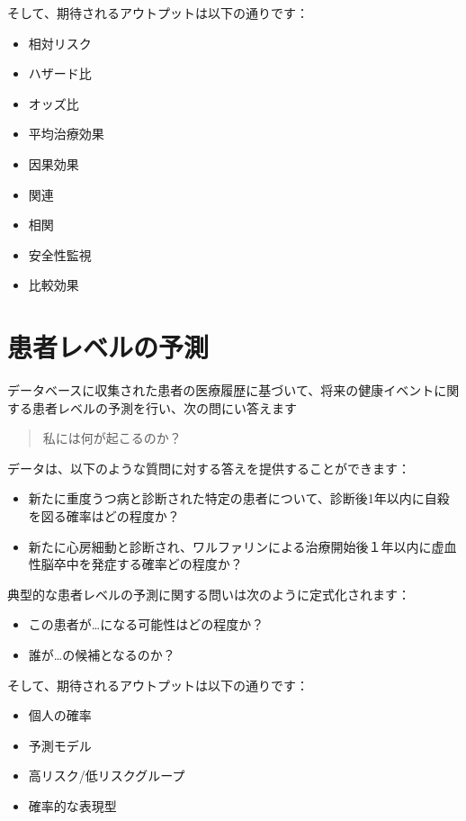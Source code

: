 \documentclass[
  11pt]{book}
\providecommand{\tightlist}{%
  \setlength{\itemsep}{0pt}\setlength{\parskip}{0pt}}
\theoremstyle{definition}
\theoremstyle{definition}
\theoremstyle{definition}
\theoremstyle{definition}
\theoremstyle{remark}
\begin{document}
そして、期待されるアウトプットは以下の通りです：

\begin{itemize}
\tightlist
\item
  相対リスク
\item
  ハザード比
\item
  オッズ比
\item
  平均治療効果
\item
  因果効果
\item
  関連
\item
  相関
\item
  安全性監視
\item
  比較効果
\end{itemize}

\section{患者レベルの予測}\label{ux60a3ux8005ux30ecux30d9ux30ebux306eux4e88ux6e2c}


データベースに収集された患者の医療履歴に基づいて、将来の健康イベントに関する患者レベルの予測を行い、次の問にい答えます

\begin{quote}
私には何が起こるのか？
\end{quote}

データは、以下のような質問に対する答えを提供することができます：

\begin{itemize}
\tightlist
\item
  新たに重度うつ病と診断された特定の患者について、診断後1年以内に自殺を図る確率はどの程度か？
\item
  新たに心房細動と診断され、ワルファリンによる治療開始後１年以内に虚血性脳卒中を発症する確率どの程度か？
\end{itemize}

典型的な患者レベルの予測に関する問いは次のように定式化されます：

\begin{itemize}
\tightlist
\item
  この患者が\ldots になる可能性はどの程度か？
\item
  誰が\ldots の候補となるのか？
\end{itemize}

そして、期待されるアウトプットは以下の通りです：

\begin{itemize}
\tightlist
\item
  個人の確率
\item
  予測モデル
\item
  高リスク/低リスクグループ
\item
  確率的な表現型
\end{itemize}
\end{document}
